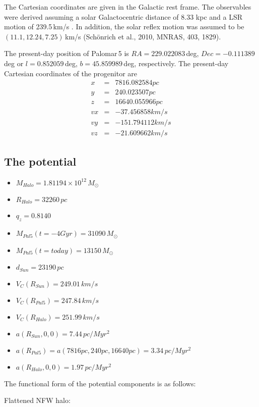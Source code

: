 \documentclass{mn2e}
\begin{document}
The Cartesian coordinates are given in the Galactic rest frame. The observables were derived assuming a solar Galactocentric distance of 8.33 kpc and a LSR motion of 239.5\,km/s \cite{2009ApJ...692.1075G}. In addition, the solar reflex motion was assumed to be $(11.1, 12.24, 7.25)$\,km/s (Sch{\"{o}}nrich et al., 2010, MNRAS, 403, 1829).  

The present-day position of Palomar\,5 is $RA = 229.022083$\,deg, $Dec = -0.111389$\,deg or $l = 0.852059$\,deg, $b = 45.859989$\,deg, respectively. The present-day Cartesian coordinates of the progenitor are 
\begin{eqnarray}
  x &=& 7816.082584 pc\\
  y &=& 240.023507 pc\\
  z &=& 16640.055966 pc\\
  vx &=& -37.456858 km/s\\
  vy &=& -151.794112 km/s\\
  vz &=& -21.609662 km/s
\end{eqnarray}


\subsection{The potential}

\begin{itemize}
  \item $M_{Halo} = 1.81194\times 10^{12}\,M_{\odot}$
  \item $R_{Halo} = 32260\,pc$
  \item $q_z = 0.8140$
  \item $M_{Pal5}(t=-4 Gyr) = 31090\,M_{\odot}$
  \item $M_{Pal5}(t=today) = 13150\,M_{\odot}$
  \item $d_{Sun} = 23190\,pc$
  \item $V_C(R_{Sun}) = 249.01\,km/s$
  \item $V_C(R_{Pal5}) = 247.84\,km/s$
  \item $V_C(R_{Halo}) = 251.99\,km/s$
  \item $a(R_{Sun}, 0, 0) = 7.44\,pc/Myr^2$
  \item $a(R_{Pal5}) = a(7816 pc, 240 pc, 16640 pc) = 3.34\,pc/Myr^2$
  \item $a(R_{Halo}, 0, 0) = 1.97\,pc/Myr^2$
\end{itemize}


The functional form of the potential components is as follows:

Flattened NFW halo:
\end{document}
